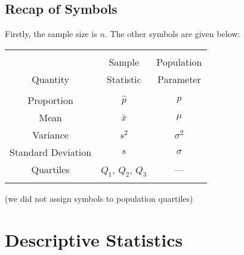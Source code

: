\subsection{Recap of Symbols}
\begin{frame}{\bf {}}
Firstly, the sample size is $n$. The other symbols are given below:\\[0.3cm]
\begin{center}
\begin{tabular}{|c|c|c|}
\hline
&&\\[-0.3cm]
& Sample & Population \\
Quantity & Statistic & Parameter \\[0.1cm]
\hline
&&\\[-0.3cm]
Proportion & $\hat p$ & $p$ \\[0.2cm]
Mean & $\bar x$ & $\mu$ \\[0.2cm]
Variance & $s^2$ & $\sigma^2$ \\[0.2cm]
Standard Deviation & $s$\phantom{$^2$} & $\sigma$\phantom{$^2$} \\[0.2cm]
Quartiles & $Q_1$, $Q_2$, $Q_3$ & ---\\[0.2cm]
\hline
\multicolumn{3}{c}{}\\
\end{tabular}
\end{center}
{\footnotesize(we did not assign symbols to population quartiles)}
\end{frame}


\section{Descriptive Statistics}

%
%
%
